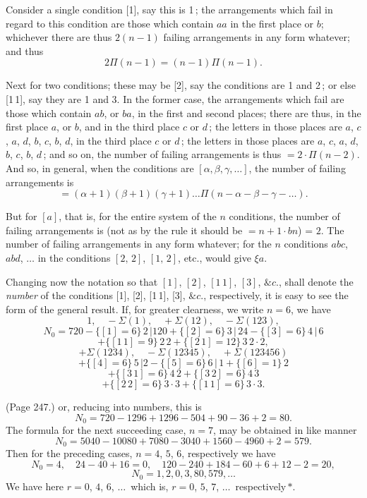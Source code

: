 \documentclass[11pt,a4paper]{book}
\begin{document}
Consider a single condition [1], say this is 1\,; the arrangements which fail in regard to this condition are those which contain $a a$ in the first place or $b$; whichever there are thus $2 (n - 1)$ failing arrangements in any form whatever; and thus
\[
2 \Pi (n - 1) = (n - 1) \Pi(n - 1).
\]

Next for two conditions; these may be [2], say the conditions are 1 and 2\,; or else [1\,1], say they are 1 and 3. In the former case, the arrangements which fail are those which contain $ab$, or $ba$, in the first and second places; there are thus, in the first place $a$, or $b$, and in the third place $c$ or $d$\,; the letters in those places are $a$, $c$, $a$, $d$, $b$, $c$, $b$, $d$, in the third place $c$ or $d$\,; the letters in those places are $a$, $c$, $a$, $d$, $b$, $c$, $b$, $d$\,; and so on, the number of failing arrangements is thus $= 2\cdot \Pi (n - 2)$. And so, in general, when the conditions are $[\alpha, \beta, \gamma, \ldots]$, the number of failing arrangements is
\[
= ( \alpha + 1)(\beta + 1)(\gamma + 1)\ldots \Pi (n - \alpha - \beta - \gamma - \ldots).
\]

But for $[a]$, that is, for the entire system of the $n$ conditions, the number of failing arrangements is (not as by the rule it should be $= n + 1\cdot bn$) = $2$. The number of failing arrangements in any form whatever; for the $n$ conditions $abc$, $abd$, $\ldots$ in the conditions $[2,\,2]$, $[1,\,2]$, etc., would give $\xi a$.

Changing now the notation so that $[1]$, $[2]$, $[1\,1]$, $[3]$, $\&c$., shall denote the \emph{number} of the conditions [1], [2], [1\,1], [3], $\&c$., respectively, it is easy to see the form of the general result. If, for greater clearness, we write $n = 6$, we have
\[
1, \quad - \Sigma(1), \quad + \Sigma(12), \quad - \Sigma(123),
\]
\[
N_0 = 720 - \{[1] = 6\}\,2\,| 120 + \{[2] = 6\}\,3\,|\,24 - \{[3] = 6\}\,4\,|\,6
\]
\[
+ \{[1\,1] = 9\}\,2\,2 + \{[2\,1] = 12\}\,3\,2\cdot 2,
\]
\[
+ \Sigma(1234), \quad - \Sigma(12345), \quad + \Sigma(123456)
\]
\[
+ \{[4] = 6\}\,5\,| 2 - \{[5] = 6\}\,6\,|\,1 + \{[6] = 1\}\,2
\]
\[
+ \{[3\,1] = 6\}\,4\,2 + \{[3\,2] = 6\}\,4\,3
\]
\[
+ \{[2\,2] = 6\}\,3\cdot 3 + \{[1\,1] = 6\}\,3\cdot 3.
\]

\medskip

\noindent (Page 247.) or, reducing into numbers, this is
\[
N_0 = 720 - 1296 + 1296 - 504 + 90 - 36 + 2 = 80.
\]
The formula for the next succeeding case, $n = 7$, may be obtained in like manner
\[
N_0 = 5040 - 10080 + 7080 - 3040 + 1560 - 4960 + 2 = 579.
\]
Then for the preceding cases, $n = 4$, $5$, $6$, respectively we have
\[
N_0 = 4, \quad 24 - 40 + 16 = 0, \quad 120 - 240 + 184 - 60 + 6 + 12 - 2 = 20,
\]
\[
N_0 = 1, 2, 0, 3, 80, 579, \ldots
\]
We have here $r = 0$, $4$, $6$, $\ldots$\ which is, $r = 0$, $5$, $7$, $\ldots$\ respectively\,$\ast$.
\end{document}
